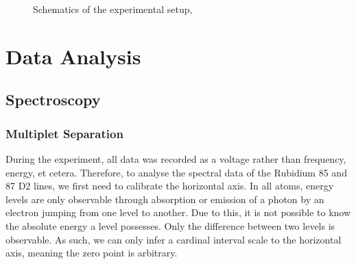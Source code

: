 \documentclass[12pt, a4paper]{article}
\begin{document}
\begin{figure}[h]
\centering
\caption{Schematics of the experimental setup, \cite{script}}
	\label{expsetup}
\end{figure}









\newpage

\section{Data Analysis}
\subsection{Spectroscopy}
\subsubsection{Multiplet Separation}

During the experiment, all data was recorded as a voltage rather than frequency, energy, et cetera. Therefore, to analyse the spectral data of the Rubidium 85 and 87 D2 lines, we first need to calibrate the horizontal axis. In all atoms, energy levels are only observable through absorption or emission of a photon by an electron jumping from one level to another. Due to this, it is not possible to know the absolute energy a level possesses. Only the difference between two levels is observable. As such, we can only infer a cardinal interval scale to the horizontal axis, meaning the zero point is arbitrary.
\end{document}
